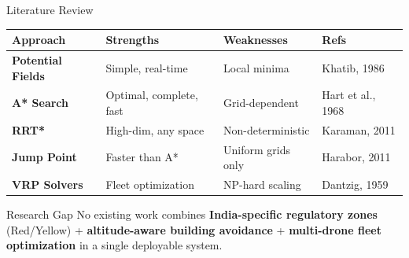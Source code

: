 \documentclass[aspectratio=169, 11pt]{beamer}
\begin{document}
\begin{frame}{Literature Review}
\small
\begin{tabular}{@{}p{2.5cm}p{3.5cm}p{3.0cm}p{3.5cm}@{}}
\toprule
\textcolor{neongreen}{\textbf{Approach}} & \textcolor{neongreen}{\textbf{Strengths}} & \textcolor{dangerred}{\textbf{Weaknesses}} & \textcolor{accentblue}{\textbf{Refs}} \\
\midrule
\textbf{Potential Fields} & Simple, real-time & Local minima & Khatib, 1986 \\[0.2cm]
\textbf{A* Search} & Optimal, complete, fast & Grid-dependent & Hart et al., 1968 \\[0.2cm]
\textbf{RRT*} & High-dim, any space & Non-deterministic & Karaman, 2011 \\[0.2cm]
\textbf{Jump Point} & Faster than A* & Uniform grids only & Harabor, 2011 \\[0.2cm]
\textbf{VRP Solvers} & Fleet optimization & NP-hard scaling & Dantzig, 1959 \\
\bottomrule
\end{tabular}

\vspace{0.4cm}
\begin{alertblock}{Research Gap}
No existing work combines \textbf{India-specific regulatory zones} (Red/Yellow) + \textbf{altitude-aware building avoidance} + \textbf{multi-drone fleet optimization} in a single deployable system.
\end{alertblock}
\end{frame}
\end{document}
